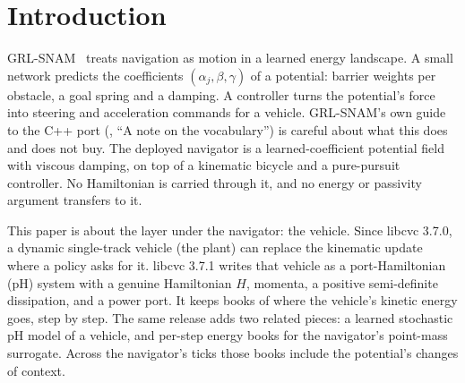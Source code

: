 \documentclass[11pt]{article}
\theoremstyle{remark}
\begin{document}
\section{Introduction}
\label{sec:intro}

GRL-SNAM~\cite{grlsnam2025} treats navigation as motion in a learned energy landscape. A small
network predicts the coefficients $(\alpha_j,\beta,\gamma)$ of a potential: barrier weights per
obstacle, a goal spring and a damping. A controller turns the potential's force into steering and
acceleration commands for a vehicle. GRL-SNAM's own guide to the C++ port
(, ``A note on the vocabulary'') is careful about what
this does and does not buy. The deployed navigator is a learned-coefficient potential field with
viscous damping, on top of a kinematic bicycle and a pure-pursuit controller. No Hamiltonian is
carried through it, and no energy or passivity argument transfers to it.

This paper is about the layer under the navigator: the vehicle. Since libcvc 3.7.0, a dynamic
single-track vehicle (the plant) can replace the kinematic update where a policy asks for it.
libcvc 3.7.1 writes that vehicle as a port-Hamiltonian (pH) system with a genuine Hamiltonian $H$,
momenta, a positive semi-definite dissipation, and a power port. It keeps books of where the
vehicle's kinetic energy goes, step by step. The same release adds two related pieces: a learned
stochastic pH model of a vehicle, and per-step energy books for the navigator's point-mass
surrogate. Across the navigator's ticks those books include the potential's changes of context.
\end{document}
